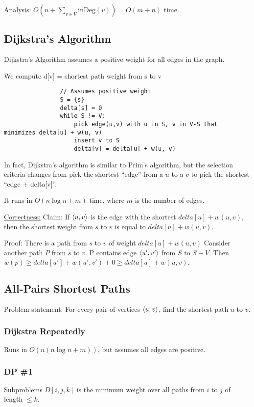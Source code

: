             Analysis: $O(n + \sum_{v \in V} \text{inDeg}(v)) = O(m + n)$ time.
        \subsection{Dijkstra's Algorithm}
            Dijkstra's Algorithm assumes a positive weight for all edges in the
            graph.

            We compute d[v] = shortest path weight from s to v
            \begin{verbatim}
                // Assumes positive weight
                S = {s}
                delta[s] = 0
                while S != V:
                    pick edge(u,v) with u in S, v in V-S that minimizes delta[u] + w(u, v)
                    insert v to S
                    delta[v] = delta[u] + w(u, v)
            \end{verbatim}

            In fact, Dijkstra's algorithm is similar to Prim's algorithm, but
            the selection criteria changes from pick the shortest ``edge'' from
            a $u$ to a $v$ to pick the shortest ``edge + delta[v]''.

            It runs in $O(n \log n + m)$ time, where $m$ is the number of edges.

            \uline{Correctness:}
            Claim: If $\left \langle u, v \right \rangle $ is the edge with the shortest
            $delta[u]+w(u,v)$, then the shortest weight from $s$ to $v$ is equal
            to $delta[u]+w(u,v)$.

            Proof: There is a path from $s$ to $v$ of weight $delta[u] + w(u,v)$
            Consider another path $P$ from $s$ to $v$.
            P contains edge $\left \langle u',v' \right \rangle $ from $S$ to $S-V$.
            Then $w(p) \ge delta[u'] + w(u', v') + 0 \ge delta[u] + w(u,v)$.

        \subsection{All-Pairs Shortest Paths}
            Problem statement: For every pair of vertices $\left \langle u,v \right \rangle $, find
            the shortest path $u$ to $v$.
            \subsubsection{Dijkstra Repeatedly}
                Runs in $O(n(n \log n + m))$, but assumes all edges are
                positive.
            \subsubsection{DP \#1}
                Subproblems $D[i,j,k]$ is the minimum weight over all paths
                from $i$ to $j$ of length $\le k$.

